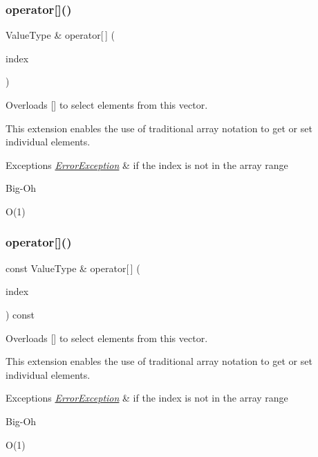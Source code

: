\subsubsection{\texorpdfstring{operator[]()}{operator[]()}\hspace{0.1cm}{\footnotesize\ttfamily [1/2]}}
{\footnotesize\ttfamily Value\+Type \& operator\mbox{[}$\,$\mbox{]} (\begin{DoxyParamCaption}\item[{int}]{index }\end{DoxyParamCaption})}



Overloads {\ttfamily \mbox{[}\mbox{]}} to select elements from this vector. 

This extension enables the use of traditional array notation to get or set individual elements. 
\begin{DoxyExceptions}{Exceptions}
{\em \mbox{\hyperlink{classErrorException}{Error\+Exception}}} & if the index is not in the array range \\
\hline
\end{DoxyExceptions}
\begin{DoxyRefDesc}{Big-\/\+Oh}
\item[\mbox{\hyperlink{BigOh__BigOh000135}{Big-\/\+Oh}}]O(1) \end{DoxyRefDesc}
\mbox{\label{classVector_a1b5a4ea461655cbe512ab976aad8d809}} 
\subsubsection{\texorpdfstring{operator[]()}{operator[]()}\hspace{0.1cm}{\footnotesize\ttfamily [2/2]}}
{\footnotesize\ttfamily const Value\+Type \& operator\mbox{[}$\,$\mbox{]} (\begin{DoxyParamCaption}\item[{int}]{index }\end{DoxyParamCaption}) const}



Overloads {\ttfamily \mbox{[}\mbox{]}} to select elements from this vector. 

This extension enables the use of traditional array notation to get or set individual elements. 
\begin{DoxyExceptions}{Exceptions}
{\em \mbox{\hyperlink{classErrorException}{Error\+Exception}}} & if the index is not in the array range \\
\hline
\end{DoxyExceptions}
\begin{DoxyRefDesc}{Big-\/\+Oh}
\item[\mbox{\hyperlink{BigOh__BigOh000136}{Big-\/\+Oh}}]O(1) \end{DoxyRefDesc}
\mbox{\label{classVector_ab48f65e37130b674bc0f6220cbb59491}} 
